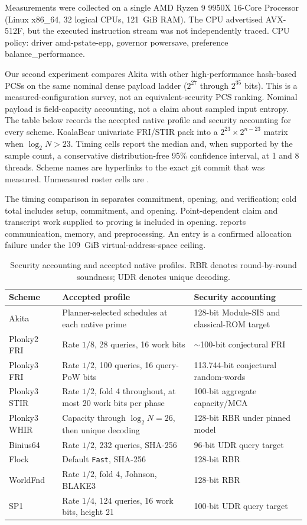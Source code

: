 Measurements were collected on a single AMD Ryzen 9 9950X 16-Core Processor (Linux x86\_64, 32 logical CPUs, 121~GiB RAM). The CPU advertised AVX-512F, but the executed instruction stream was not independently traced. CPU policy: driver amd-pstate-epp, governor powersave, preference balance\_performance.

Our second experiment compares Akita with other high-performance hash-based PCSs
on the same nominal dense payload ladder ($2^{27}$ through $2^{35}$ bits).
This is a measured-configuration survey, not an equivalent-security PCS ranking.
Nominal payload is field-capacity accounting, not a claim about sampled input entropy.
The table below records the accepted native profile and security accounting for every scheme.
KoalaBear univariate FRI/STIR pack into a $2^{23}\times 2^{n-23}$ matrix when $\log_2 N>23$. Timing cells
report the median and, when supported by the sample count, a conservative distribution-free 95\% confidence interval,
at 1 and 8 threads. Scheme names are hyperlinks to the exact git commit that was
measured. Unmeasured roster cells are \evalpending{}.

The timing comparison in  separates commitment,
opening, and verification; cold total includes setup, commitment, and opening.
Point-dependent claim and transcript work supplied to proving is included in opening.
 reports
communication, memory, and preprocessing. An \evaloom{} entry is a confirmed allocation failure under the 109~GiB virtual-address-space ceiling.

\begin{table}[t]
\centering
\caption{Security accounting and accepted native profiles. RBR denotes round-by-round soundness; UDR denotes unique decoding.}
\begin{tabularx}{\linewidth}{@{}lXX@{}}
\toprule
Scheme & Accepted profile & Security accounting \\
\midrule
Akita & Planner-selected schedules at each native prime & 128-bit Module-SIS and classical-ROM target \\
Plonky2 FRI & Rate $1/8$, 28 queries, 16 work bits & $\sim$100-bit conjectural FRI \\
Plonky3 FRI & Rate $1/2$, 100 queries, 16 query-PoW bits & 113.744-bit conjectural random-words \\
Plonky3 STIR & Rate $1/2$, fold 4 throughout, at most 20 work bits per phase & 100-bit aggregate capacity/MCA \\
Plonky3 WHIR & Capacity through $\log_2N=26$, then unique decoding & 128-bit RBR under pinned model \\
Binius64 & Rate $1/2$, 232 queries, SHA-256 & 96-bit UDR query target \\
Flock & Default \texttt{Fast}, SHA-256 & 128-bit RBR \\
WorldFnd & Rate $1/2$, fold 4, Johnson, BLAKE3 & 128-bit RBR \\
SP1 & Rate $1/4$, 124 queries, 16 work bits, height 21 & 100-bit UDR query target \\
\bottomrule
\end{tabularx}
\end{table}

